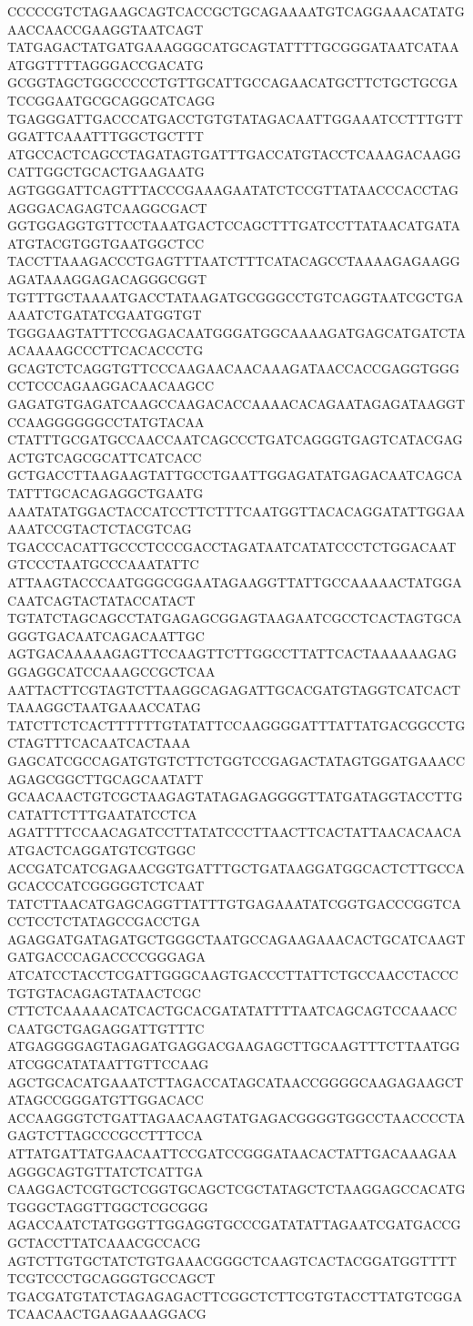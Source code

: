 CCCCCGTCTAGAAGCAGTCACCGCTGCAGAAAATGTCAGGAAACATATGAACCAACCGAAGGTAATCAGT
TATGAGACTATGATGAAAGGGCATGCAGTATTTTGCGGGATAATCATAAATGGTTTTAGGGACCGACATG
GCGGTAGCTGGCCCCCTGTTGCATTGCCAGAACATGCTTCTGCTGCGATCCGGAATGCGCAGGCATCAGG
TGAGGGATTGACCCATGACCTGTGTATAGACAATTGGAAATCCTTTGTTGGATTCAAATTTGGCTGCTTT
ATGCCACTCAGCCTAGATAGTGATTTGACCATGTACCTCAAAGACAAGGCATTGGCTGCACTGAAGAATG
AGTGGGATTCAGTTTACCCGAAAGAATATCTCCGTTATAACCCACCTAGAGGGACAGAGTCAAGGCGACT
GGTGGAGGTGTTCCTAAATGACTCCAGCTTTGATCCTTATAACATGATAATGTACGTGGTGAATGGCTCC
TACCTTAAAGACCCTGAGTTTAATCTTTCATACAGCCTAAAAGAGAAGGAGATAAAGGAGACAGGGCGGT
TGTTTGCTAAAATGACCTATAAGATGCGGGCCTGTCAGGTAATCGCTGAAAATCTGATATCGAATGGTGT
TGGGAAGTATTTCCGAGACAATGGGATGGCAAAAGATGAGCATGATCTAACAAAAGCCCTTCACACCCTG
GCAGTCTCAGGTGTTCCCAAGAACAACAAAGATAACCACCGAGGTGGGCCTCCCAGAAGGACAACAAGCC
GAGATGTGAGATCAAGCCAAGACACCAAAACACAGAATAGAGATAAGGTCCAAGGGGGGCCTATGTACAA
CTATTTGCGATGCCAACCAATCAGCCCTGATCAGGGTGAGTCATACGAGACTGTCAGCGCATTCATCACC
GCTGACCTTAAGAAGTATTGCCTGAATTGGAGATATGAGACAATCAGCATATTTGCACAGAGGCTGAATG
AAATATATGGACTACCATCCTTCTTTCAATGGTTACACAGGATATTGGAAAAATCCGTACTCTACGTCAG
TGACCCACATTGCCCTCCCGACCTAGATAATCATATCCCTCTGGACAATGTCCCTAATGCCCAAATATTC
ATTAAGTACCCAATGGGCGGAATAGAAGGTTATTGCCAAAAACTATGGACAATCAGTACTATACCATACT
TGTATCTAGCAGCCTATGAGAGCGGAGTAAGAATCGCCTCACTAGTGCAGGGTGACAATCAGACAATTGC
AGTGACAAAAAGAGTTCCAAGTTCTTGGCCTTATTCACTAAAAAAGAGGGAGGCATCCAAAGCCGCTCAA
AATTACTTCGTAGTCTTAAGGCAGAGATTGCACGATGTAGGTCATCACTTAAAGGCTAATGAAACCATAG
TATCTTCTCACTTTTTTGTATATTCCAAGGGGATTTATTATGACGGCCTGCTAGTTTCACAATCACTAAA
GAGCATCGCCAGATGTGTCTTCTGGTCCGAGACTATAGTGGATGAAACCAGAGCGGCTTGCAGCAATATT
GCAACAACTGTCGCTAAGAGTATAGAGAGGGGTTATGATAGGTACCTTGCATATTCTTTGAATATCCTCA
AGATTTTCCAACAGATCCTTATATCCCTTAACTTCACTATTAACACAACAATGACTCAGGATGTCGTGGC
ACCGATCATCGAGAACGGTGATTTGCTGATAAGGATGGCACTCTTGCCAGCACCCATCGGGGGTCTCAAT
TATCTTAACATGAGCAGGTTATTTGTGAGAAATATCGGTGACCCGGTCACCTCCTCTATAGCCGACCTGA
AGAGGATGATAGATGCTGGGCTAATGCCAGAAGAAACACTGCATCAAGTGATGACCCAGACCCCGGGAGA
ATCATCCTACCTCGATTGGGCAAGTGACCCTTATTCTGCCAACCTACCCTGTGTACAGAGTATAACTCGC
CTTCTCAAAAACATCACTGCACGATATATTTTAATCAGCAGTCCAAACCCAATGCTGAGAGGATTGTTTC
ATGAGGGGAGTAGAGATGAGGACGAAGAGCTTGCAAGTTTCTTAATGGATCGGCATATAATTGTTCCAAG
AGCTGCACATGAAATCTTAGACCATAGCATAACCGGGGCAAGAGAAGCTATAGCCGGGATGTTGGACACC
ACCAAGGGTCTGATTAGAACAAGTATGAGACGGGGTGGCCTAACCCCTAGAGTCTTAGCCCGCCTTTCCA
ATTATGATTATGAACAATTCCGATCCGGGATAACACTATTGACAAAGAAAGGGCAGTGTTATCTCATTGA
CAAGGACTCGTGCTCGGTGCAGCTCGCTATAGCTCTAAGGAGCCACATGTGGGCTAGGTTGGCTCGCGGG
AGACCAATCTATGGGTTGGAGGTGCCCGATATATTAGAATCGATGACCGGCTACCTTATCAAACGCCACG
AGTCTTGTGCTATCTGTGAAACGGGCTCAAGTCACTACGGATGGTTTTTCGTCCCTGCAGGGTGCCAGCT
TGACGATGTATCTAGAGAGACTTCGGCTCTTCGTGTACCTTATGTCGGATCAACAACTGAAGAAAGGACG
